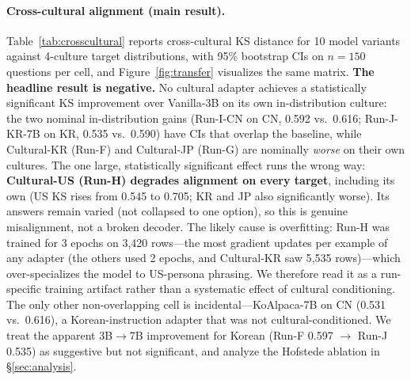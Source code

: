 \documentclass{article}
\begin{document}
\paragraph{Cross-cultural alignment (main result).}
Table~\ref{tab:crosscultural} reports cross-cultural KS distance for 10 model variants against 4-culture target distributions, with 95\% bootstrap CIs on $n=150$ questions per cell, and Figure~\ref{fig:transfer} visualizes the same matrix. \textbf{The headline result is negative.} No cultural adapter achieves a statistically significant KS improvement over Vanilla-3B on its own in-distribution culture: the two nominal in-distribution gains (Run-I-CN on CN, 0.592 vs.\ 0.616; Run-J-KR-7B on KR, 0.535 vs.\ 0.590) have CIs that overlap the baseline, while Cultural-KR (Run-F) and Cultural-JP (Run-G) are nominally \emph{worse} on their own cultures. The one large, statistically significant effect runs the wrong way: \textbf{Cultural-US (Run-H) degrades alignment on every target}, including its own (US KS rises from 0.545 to 0.705; KR and JP also significantly worse). Its answers remain varied (not collapsed to one option), so this is genuine misalignment, not a broken decoder. The likely cause is overfitting: Run-H was trained for 3 epochs on 3{,}420 rows---the most gradient updates per example of any adapter (the others used 2 epochs, and Cultural-KR saw 5{,}535 rows)---which over-specializes the model to US-persona phrasing. We therefore read it as a run-specific training artifact rather than a systematic effect of cultural conditioning. The only other non-overlapping cell is incidental---KoAlpaca-7B on CN (0.531 vs.\ 0.616), a Korean-instruction adapter that was not cultural-conditioned. We treat the apparent 3B$\to$7B improvement for Korean (Run-F 0.597 $\to$ Run-J 0.535) as suggestive but not significant, and analyze the Hofstede ablation in \S\ref{sec:analysis}.
\end{document}
